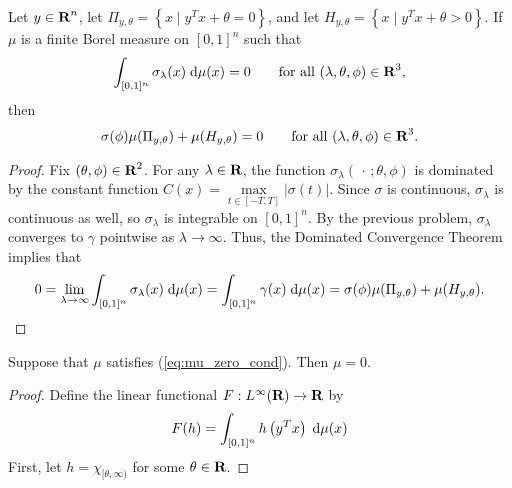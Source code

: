 \documentclass{homework}
\begin{document}
	\question
	\newcommand{\zset}{\Pi_{y,\theta}}
	\newcommand{\pset}{H_{y,\theta}}
	Let $y \in \textbf{R}^n$, let $\zset = \left\{x\mid y^Tx + \theta = 0\right\}$, and let $\pset=\left\{x\mid y^Tx+\theta > 0\right\}$. If $\mu$ is a finite Borel measure on $[0,1]^n$ such that
	\begin{equation}
		\label{eq:mu_zero_cond}
		\int_{[0,1]^n}\sigma_\lambda(x)\;\text{d}\mu(x) = 0 \qquad \text{for all } (\lambda, \theta, \phi)\in\textbf{R}^3,
	\end{equation}
	then
	\begin{equation}
		\sigma(\phi)\mu(\zset) + \mu(\pset) = 0\qquad \text{for all } (\lambda, \theta, \phi)\in\R^3.
	\end{equation}
	\begin{proof}
		Fix $(\theta,\phi)\in\textbf{R}^2$. For any $\lambda \in \textbf{R}$, the function $\sigma_\lambda(\,\cdot\,;\theta,\phi)$ is dominated by the constant function $C(x) = \max\limits_{t\in[-T,T]}|\sigma(t)|$. Since $\sigma$ is continuous, $\sigma_\lambda$ is continuous as well, so $\sigma_\lambda$ is integrable on $[0,1]^n$. By the previous problem, $\sigma_\lambda$ converges to $\gamma$ pointwise as $\lambda \to \infty$. Thus, the Dominated Convergence Theorem implies that
		\begin{equation}
			0=\lim_{\lambda\to\infty}\int_{[0,1]^n}\sigma_\lambda(x)\dee\mu(x) = \int_{[0,1]^n} \gamma(x)\dee\mu(x) = \sigma(\phi)\mu(\zset) + \mu(\pset).
		\end{equation}
	\end{proof}
	
	\question
	Suppose that $\mu$ satisfies (\ref{eq:mu_zero_cond}). Then $\mu = 0$. 
	\begin{proof}
		Define the linear functional $F: L^\infty(\textbf{R}) \to \textbf{R}$ by
		\begin{equation}
			F(h) = \int_{[0,1]^n}h\left(y^Tx\right)\;\text{d}\mu(x)
		\end{equation}
		First, let $h = \chi_{[\theta,\infty)}$ for some $\theta \in \textbf{R}$.
	\end{proof}
\end{document}
